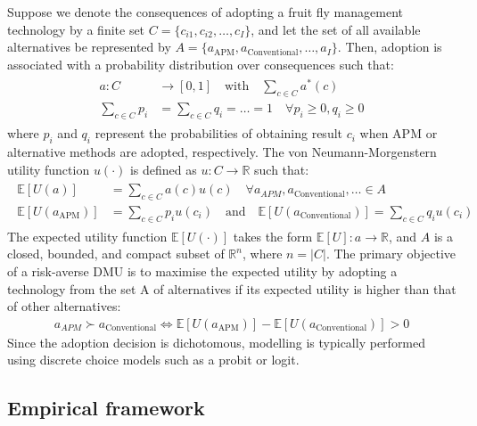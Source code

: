 \documentclass[fleqn,twoside,reqno]{article}
\begin{document}
Suppose we denote the consequences of adopting a fruit fly management technology by a finite set $C = \{c_{i1}, c_{i2}, \ldots, c_I\}$, and let the set of all available alternatives be represented by $A = \{a_{\text{APM}}, a_{\text{Conventional}}, \ldots, a_I\}$. Then, adoption is associated with a probability distribution over consequences such that:
\begin{align}
\begin{split}
a: C & \longrightarrow [0, 1] \quad \text{with} \quad \sum_{c \in C} a^*(c)\\
\sum_{c \in C} p_i &= \sum_{c \in C} q_i = \ldots = 1 \quad \forall p_i \geq 0, q_i \geq 0
\end{split}
\label{eq:2}
\end{align}
where $p_i$ and $q_i$ represent the probabilities of obtaining result $c_i$ when APM or alternative methods are adopted, respectively. The von Neumann-Morgenstern utility function $u(\cdot)$ is defined as $u: C \longrightarrow \mathbb{R}$ such that:
\begin{align}
\begin{split}
\mathbb{E}[U(a)] &= \sum_{c \in C} a(c) u(c) \quad \forall a_{APM}, a_{\text{Conventional}}, \ldots \in A\\
\mathbb{E}[U(a_{\text{APM}})] &= \sum_{c \in C} p_i u(c_i) \quad \text{and} \quad
\mathbb{E}[U(a_{\text{Conventional}})] = \sum_{c \in C} q_i u(c_i)
\end{split}
\label{eq:3}
\end{align}
The expected utility function $\mathbb{E}[U(\cdot)]$ takes the form $\mathbb{E}[U]: a \longrightarrow \mathbb{R}$, and $A$ is a closed, bounded, and compact subset of $\mathbb{R}^n$, where $n = |C|$. The primary objective of a risk-averse DMU is to maximise the expected utility by adopting a technology from the set A of alternatives if its expected utility is higher than that of other alternatives:
\begin{align}
a_{APM} \succ a_{\text{Conventional}} \Leftrightarrow \mathbb{E}[U(a_{\text{APM}})] - \mathbb{E}[U(a_{\text{Conventional}})] > 0 
\end{align}
Since the adoption decision is dichotomous, modelling is typically performed using discrete choice models such as a probit or logit.

\subsection{Empirical framework}
\end{document}
